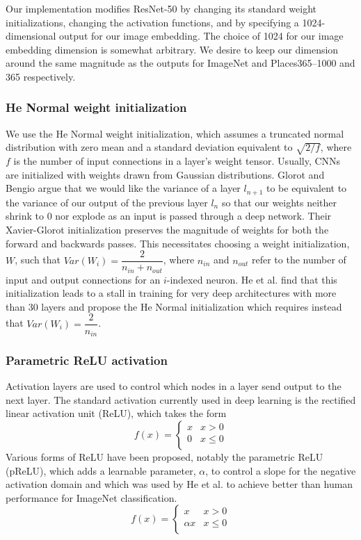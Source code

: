 Our implementation modifies ResNet-50 by changing its standard weight initializations, changing the activation functions, and by specifying a 1024-dimensional output for our image embedding. The choice of 1024 for our image embedding dimension is somewhat arbitrary. We desire to keep our dimension around the same magnitude as the outputs for ImageNet and Places365--1000 and 365 respectively.


\subsubsection{He Normal weight initialization}
We use the He Normal weight initialization, which assumes a truncated normal distribution with zero mean and a standard deviation equivalent to $\sqrt{2 / f}$, where $f$ is the number of input connections in a layer's weight tensor. Usually, CNNs are initialized with weights drawn from Gaussian distributions. Glorot and Bengio argue that we would like the variance of a layer $l_{n+1}$ to be equivalent to the variance of our output of the previous layer $l_{n}$ so that our weights neither shrink to 0 nor explode as an input is passed through a deep network.\cite{glorot2010understanding} Their Xavier-Glorot initialization preserves the magnitude of weights for both the forward and backwards passes. This necessitates choosing a weight initialization, $W$, such that $Var(W_i) = \dfrac{2}{n_{in}+n_{out}}$, where $n_{in}$ and $n_{out}$ refer to the number of input and output connections for an $i$-indexed neuron. He et al. find that this initialization leads to a stall in training for very deep architectures with more than 30 layers and propose the He Normal initialization which requires instead that $Var(W_i) = \dfrac{2}{n_{in}}$.\cite{he2015delving}

\subsubsection{Parametric ReLU activation}
Activation layers are used to control which nodes in a layer send output to the next layer. The standard activation currently used in deep learning is the rectified linear activation unit (ReLU), which takes the form
\begin{equation}
f(x) = \begin{cases}
x & x > 0 \\
0 & x\leq 0 \\
\end{cases}
\end{equation}
Various forms of ReLU have been proposed, notably the parametric ReLU (pReLU), which adds a learnable parameter, $\alpha$, to control a slope for the negative activation domain and which was used by He et al. to achieve better than human performance for ImageNet classification.\cite{he2016deep}
\begin{equation}
f(x) = \begin{cases}
x & x > 0 \\
\alpha x & x \leq 0 \\
\end{cases}
\end{equation} 

